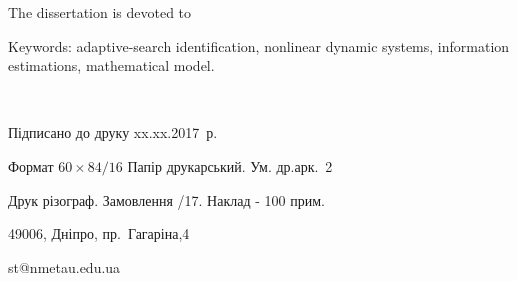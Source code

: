 \documentclass[a4paper,12pt]{atuaref}
\begin{document}
The dissertation is devoted to

Keywords: adaptive-search identification, nonlinear dynamic systems,
information estimations, mathematical model.

\clearpage

{~}
\vfill

\begin{center}


Підписано до друку xx.xx.2017~р.

Формат $60 \times 84/16$  Папір друкарський. Ум. др.арк.~2

Друк різограф. Замовлення /17. Наклад - 100 прим.


49006, Дніпро, пр.~Гагаріна,4

st@nmetau.edu.ua

\end{center}

\vfill
\end{document}
